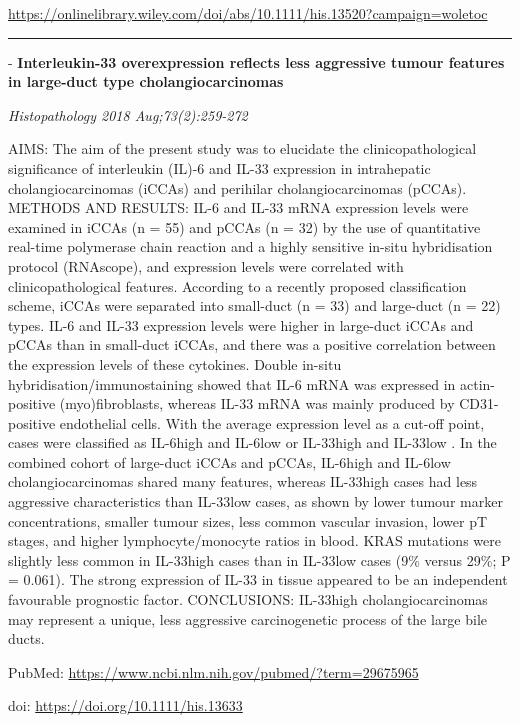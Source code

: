 \documentclass[]{article}
\begin{document}
\url{https://onlinelibrary.wiley.com/doi/abs/10.1111/his.13520?campaign=woletoc}

\begin{center}\rule{0.5\linewidth}{\linethickness}\end{center}

 - \textbf{Interleukin-33 overexpression reflects less aggressive tumour
features in large-duct type cholangiocarcinomas}

\emph{Histopathology 2018 Aug;73(2):259-272}

AIMS: The aim of the present study was to elucidate the
clinicopathological significance of interleukin (IL)-6 and IL-33
expression in intrahepatic cholangiocarcinomas (iCCAs) and perihilar
cholangiocarcinomas (pCCAs). METHODS AND RESULTS: IL-6 and IL-33 mRNA
expression levels were examined in iCCAs (n = 55) and pCCAs (n = 32) by
the use of quantitative real-time polymerase chain reaction and a highly
sensitive in-situ hybridisation protocol (RNAscope), and expression
levels were correlated with clinicopathological features. According to a
recently proposed classification scheme, iCCAs were separated into
small-duct (n = 33) and large-duct (n = 22) types. IL-6 and IL-33
expression levels were higher in large-duct iCCAs and pCCAs than in
small-duct iCCAs, and there was a positive correlation between the
expression levels of these cytokines. Double in-situ
hybridisation/immunostaining showed that IL-6 mRNA was expressed in
actin-positive (myo)fibroblasts, whereas IL-33 mRNA was mainly produced
by CD31-positive endothelial cells. With the average expression level as
a cut-off point, cases were classified as IL-6high and IL-6low or
IL-33high and IL-33low . In the combined cohort of large-duct iCCAs and
pCCAs, IL-6high and IL-6low cholangiocarcinomas shared many features,
whereas IL-33high cases had less aggressive characteristics than
IL-33low cases, as shown by lower tumour marker concentrations, smaller
tumour sizes, less common vascular invasion, lower pT stages, and higher
lymphocyte/monocyte ratios in blood. KRAS mutations were slightly less
common in IL-33high cases than in IL-33low cases (9\% versus 29\%; P =
0.061). The strong expression of IL-33 in tissue appeared to be an
independent favourable prognostic factor. CONCLUSIONS: IL-33high
cholangiocarcinomas may represent a unique, less aggressive
carcinogenetic process of the large bile ducts.

PubMed: \url{https://www.ncbi.nlm.nih.gov/pubmed/?term=29675965}

doi: \url{https://doi.org/10.1111/his.13633}
\end{document}
